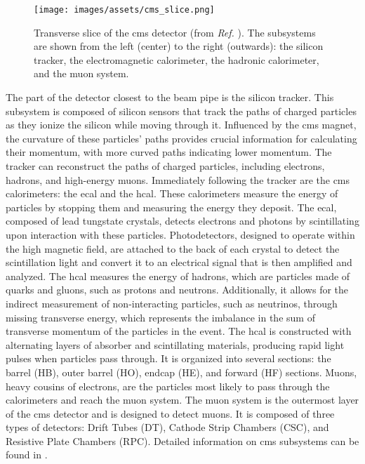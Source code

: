 \begin{figure}[h]
	\centering
	\texttt{[image: images/assets/cms\_slice.png]}
	\caption[Transverse slice of CMS detector]{Transverse slice of the \acrshort{cms} detector (from \textit{Ref.} \cite{Barney:2120661}). The subsystems are shown from the left (center) to the right (outwards): the silicon tracker, the electromagnetic calorimeter, the hadronic calorimeter, and the muon system.}
	\label{fig:cms_slice}
\end{figure}


The part of the detector closest to the beam pipe is the silicon tracker. This subsystem is composed of silicon sensors that track the paths of charged particles as they ionize the silicon while moving through it. Influenced by the \acrshort{cms} magnet, the curvature of these particles' paths provides crucial information for calculating their momentum, with more curved paths indicating lower momentum. The tracker can reconstruct the paths of charged particles, including electrons, hadrons, and high-energy muons. Immediately following the tracker are the \acrshort{cms} calorimeters: the \acrfull{ecal} and the \acrfull{hcal}. These calorimeters measure the energy of particles by stopping them and measuring the energy they deposit. The \acrshort{ecal}, composed of lead tungstate crystals, detects electrons and photons by scintillating upon interaction with these particles. Photodetectors, designed to operate within the high magnetic field, are attached to the back of each crystal to detect the scintillation light and convert it to an electrical signal that is then amplified and analyzed. The \acrshort{hcal} measures the energy of hadrons, which are particles made of quarks and gluons, such as protons and neutrons. Additionally, it allows for the indirect measurement of non-interacting particles, such as neutrinos, through missing transverse energy, which represents the imbalance in the sum of transverse momentum of the particles in the event. The \acrshort{hcal} is constructed with alternating layers of absorber and scintillating materials, producing rapid light pulses when particles pass through. It is organized into several sections: the barrel (HB), outer barrel (HO), endcap (HE), and forward (HF) sections. Muons, heavy cousins of electrons, are the particles most likely to pass through the calorimeters and reach the muon system. The muon system is the outermost layer of the \acrshort{cms} detector and is designed to detect muons. It is composed of three types of detectors: Drift Tubes (DT), Cathode Strip Chambers (CSC), and Resistive Plate Chambers (RPC). Detailed information on \acrshort{cms} subsystems can be found in \cite{TheCMSCollaboration_2008}.

